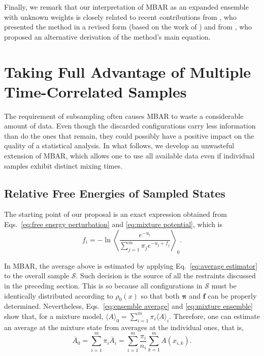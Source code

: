 \documentclass[journal=jctcce,manuscript=article,layout=twocolumn]{achemso}
\newcommand{\vt}[1]{\boldsymbol{\mathbf{#1}}}   %
\newcommand{\avg}[1]{\overline{#1}}             %
\begin{document}
Finally, we remark that our interpretation of MBAR as an expanded ensemble with unknown weights is closely related to recent contributions from \citeauthor{Shirts_2017} \cite{Shirts_2017}, who presented the method in a revised form (based on the work of \citeauthor{Geyer_1994} \cite{Geyer_1994}) and from \citeauthor{Ding_2017} \cite{Ding_2017}, who proposed an alternative derivation of the method's main equation.

\section{Taking Full Advantage of Multiple Time-Correlated Samples}

The requirement of subsampling often causes MBAR to waste a considerable amount of data. Even though the discarded configurations carry less information than do the ones that remain, they could possibly have a positive impact on the quality of a statistical analysis. In what follows, we develop an unwasteful extension of MBAR, which allows one to use all available data even if individual samples exhibit distinct mixing times.

\subsection{Relative Free Energies of Sampled States}

The starting point of our proposal is an exact expression obtained from Eqs.~\eqref{eq:free energy perturbation} and \eqref{eq:mixture potential}, which is
\begin{equation*}
\label{eq:free energy exact}
f_i = -\ln \left\langle \frac{e^{-u_i}}{\sum_{j=1}^m \pi_j e^{-u_j + f_j}} \right\rangle_0.
\end{equation*}

In MBAR, the average above is estimated by applying Eq.~\eqref{eq:average estimator} to the overall sample $\mathcal S$. Such decision is the source of all the restraints discussed in the preceding section. This is so because all configurations in $\mathcal S$ must be identically distributed according to $\rho_0(x)$ so that both $\vt \pi$ and $\vt f$ can be properly determined. Nevertheless, Eqs.~\eqref{eq:ensemble average} and \eqref{eq:mixture ensemble} show that, for a mixture model, $\langle A \rangle_0 = \sum_{i=1}^m \pi_i \langle A \rangle_i$. Therefore, one can estimate an average at the mixture state from averages at the individual ones, that is,
\begin{equation}
\label{eq:mixture average estimator}
{\avg A}_0 = \sum_{i=1}^m \pi_i \avg{A}_i = \sum_{i=1}^m \frac{\pi_i}{n_i} \sum_{k=1}^m A(x_{i,k}).
\end{equation}
\end{document}
